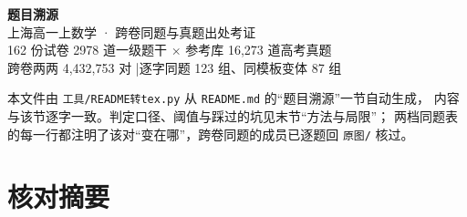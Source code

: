 \documentclass[a4paper,11pt]{article}
\begin{document}
\begin{titlepage}
\centering
\vspace*{2.6cm}
{\Huge\bfseries 题目溯源}\\[0.9em]
{\Large 上海高一上数学 · 跨卷同题与真题出处考证}\\[2.6em]
{\large 162 份试卷 2978 道一级题干 $\times$ 参考库 16{,}273 道高考真题}\\[0.35em]
{\large 跨卷两两 4{,}432{,}753 对 \quad|\quad 逐字同题 123 组、同模板变体 87 组}\\[3.2em]
\begin{minipage}{0.8\textwidth}\small\raggedright
本文件由 \texttt{工具/README转tex.py} 从 \texttt{README.md} 的“题目溯源”一节自动生成，
内容与该节逐字一致。判定口径、阈值与踩过的坑见末节“方法与局限”；
两档同题表的每一行都注明了该对“变在哪”，跨卷同题的成员已逐题回 \texttt{原图/} 核过。
\end{minipage}
\end{titlepage}

\tableofcontents
\newpage
\clearpage
\section{核对摘要}
\end{document}
